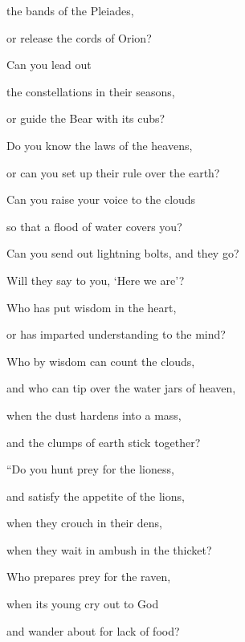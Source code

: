 {the bands
of the Pleiades,
\par }{\Q or
release the cords
of Orion?
\par }{\Q {}Can you lead out
\par }{\Q the constellations
in their seasons,
\par }{\Q or guide
the Bear
with
its cubs?
\par }{\Q {}Do you know
the laws
of the heavens,
\par }{\Q or
can you set
up their rule
over the earth?
\par }{\Q {}Can you raise
your voice
to the clouds
\par }{\Q so that a flood
of water
covers you?
\par }{\Q {}Can you send
out lightning
bolts, and they go?
\par }{\Q Will they say
to you, ‘Here we are’?
\par }{\Q {}Who
has put wisdom
in the heart,
\par }{\Q or
has imparted
understanding to the mind?
\par }{\Q {}Who
by wisdom
can count
the clouds,
\par }{\Q and who can
tip
over the water jars
of heaven,
\par }{\Q {}when the dust
hardens into
a mass,
\par }{\Q and the clumps of earth
stick together?
\par }{\Q {}“Do you hunt
prey
for the lioness,
\par }{\Q and satisfy the appetite
of the lions,
\par }{\Q {}when
they crouch
in their dens,
\par }{\Q when they wait in
ambush in the thicket?
\par }{\Q {}Who
prepares
prey
for the raven,
\par }{\Q when
its young
cry out
to God
\par }{\Q and wander
about for lack
of food?


}

